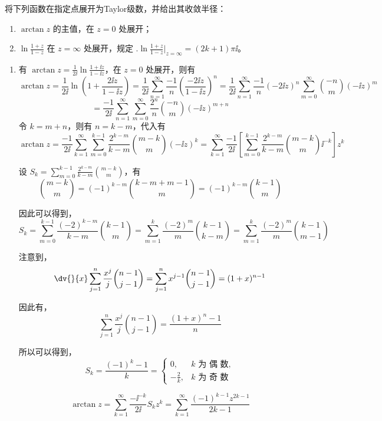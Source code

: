 
\begin{question}
将下列函数在指定点展开为Taylor级数，并给出其收敛半径：
\begin{enumerate}
  \item \(\arctan z\) 的主值，在 \(z=0\) 处展开；

  \item \(\ln \frac{1+z}{1-z}\) 在 \(z=\infty\) 处展开，规定 \(\bigl. \ln \frac{1+z}{1-z} \bigr|_{z=\infty}=(2k+1) \pi \ii\)。
\end{enumerate}
\begin{solution}
\begin{enumerate}
  \item 有 \(\arctan z = \frac{1}{2\ii} \ln \frac{1+\ii z}{1-\ii z}\)，在 \(z=0\) 处展开，则有
\[
\arctan z = \frac{1}{2\ii} \ln\!\left(1+\frac{2\ii z}{1-\ii z}\right)
= \frac{1}{2\ii} \sum_{n=1}^\infty \frac{-1}{n} \left(\frac{-2\ii z}{1-\ii z}\right)^n
= \frac{1}{2\ii} \sum_{n=1}^\infty \frac{-1}{n} (-2\ii z)^n \sum_{m=0}^\infty \binom{-n}{m} (-\ii z)^m
\]
\[
= \frac{-1}{2\ii} \sum_{n=1}^\infty \sum_{m=0}^\infty \frac{2^n}{n} \binom{-n}{m} (-\ii z)^{m+n}
\]
令 \(k = m+n\)，则有 \(n = k-m\)，代入有
\[
\arctan z = \frac{-1}{2\ii} \sum_{k=1}^\infty \sum_{m=0}^{k-1} \frac{2^{k-m}}{k-m} \binom{m-k}{m} (-\ii z)^k
= \sum_{k=1}^\infty \frac{-1}{2\ii} \left[\sum_{m=0}^{k-1} \frac{2^{k-m}}{k-m} \binom{m-k}{m} \ii^{-k}\right] z^k
\]

设 \(S_k = \sum_{m=0}^{k-1} \frac{2^{k-m}}{k-m} \binom{m-k}{m}\)，有
\[
\binom{m-k}{m}=(-1)^{k-m} \binom{k-m +m-1}{m}=(-1)^{k-m} \binom{k-1}{m}
\]

因此可以得到，
\[
S_k = \sum_{m=0}^{k-1} \frac{(-2)^{k-m}}{k-m} \binom{k-1}{m}
= \sum_{m=1}^k \frac{(-2)^m}{m} \binom{k-1}{k-m}
= \sum_{m=1}^k \frac{(-2)^m}{m} \binom{k-1}{m-1}
\]

注意到，
\[
\dv{}{x} \sum_{j=1}^n \frac{x^j}{j} \binom{n-1}{j-1}
= \sum_{j=1}^n x^{j-1} \binom{n-1}{j-1} = (1+x)^{n-1}
\]

因此有，
\[
\sum_{j=1}^n \frac{x^j}{j} \binom{n-1}{j-1} = \frac{(1+x)^n-1}{n}
\]

所以可以得到，
\[
S_k = \frac{(-1)^k-1}{k} = \begin{cases}
0, & k \text{ 为 偶 数},\\
-\frac{2}{k}, & k \text{ 为 奇 数}
\end{cases}
\]

\[
\arctan z = \sum_{k=1}^\infty \frac{-\ii^{-k}}{2\ii} S_k z^k
= \sum_{k=1}^\infty \frac{(-1)^{k-1} z^{2k-1}}{2k-1}
\]


\end{enumerate}
\end{solution}
\end{question}
